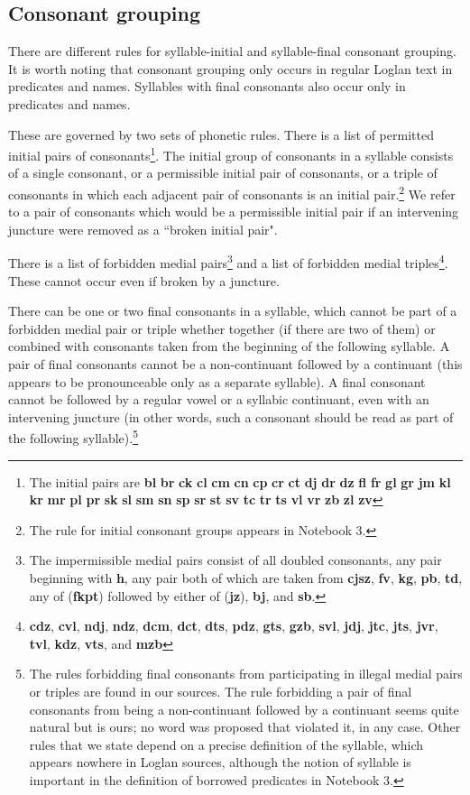 \documentclass[12pt]{book}
\begin{document}
\subsection{Consonant grouping}

There are different rules for syllable-initial and syllable-final consonant grouping.  It is worth noting that consonant grouping only occurs in regular Loglan text in predicates and names.   Syllables with final consonants also occur only in predicates and names.

These are governed by two sets of phonetic rules.  There is a list of permitted initial pairs of consonants\footnote{The initial pairs are {\bf bl}  {\bf br}  {\bf ck}  {\bf cl}  {\bf cm}  {\bf cn}   {\bf cp}  {\bf cr}   {\bf ct}   {\bf dj}   {\bf dr}   {\bf dz}  {\bf fl}  {\bf fr}   {\bf gl}   {\bf gr}   {\bf jm}   {\bf kl}  {\bf kr}   {\bf mr}   {\bf pl}  {\bf pr}   {\bf sk}  {\bf sl}   {\bf sm}  {\bf sn}  {\bf sp}   {\bf sr}  {\bf st}  {\bf sv} {\bf tc}  {\bf tr}  {\bf ts}  {\bf vl}  {\bf vr} {\bf  zb}  {\bf  zl}  {\bf zv}}.  The initial group of consonants in a syllable consists of a single consonant, or a permissible initial pair of consonants, or a triple of consonants in which each adjacent pair of consonants is an initial pair.\footnote{The rule for initial consonant groups appears in Notebook 3.}  We refer to a pair of consonants which would be a permissible initial pair if an intervening juncture were removed as a ``broken initial pair".

There is a list of forbidden medial pairs\footnote{The impermissible medial pairs consist of all doubled consonants, any pair beginning with {\bf h}, any pair both of which are taken from {\bf cjsz}, {\bf fv}, {\bf kg}, {\bf pb}, {\bf td}, any of ({\bf fkpt}) followed by either of ({\bf jz}), {\bf bj}, and {\bf sb}.}
and a list of forbidden medial triples\footnote{{\bf cdz}, {\bf cvl}, {\bf ndj}, {\bf ndz}, {\bf dcm}, {\bf dct}, {\bf dts}, {\bf pdz}, {\bf gts}, {\bf gzb}, {\bf svl}, {\bf jdj}, {\bf jtc}, {\bf jts}, {\bf jvr}, {\bf tvl}, {\bf kdz}, {\bf vts}, and {\bf mzb}}. 
 These cannot occur even if broken by a juncture.  

There can be one or two final consonants in
a syllable, which cannot be part of a forbidden medial pair or triple whether together (if there are two of them) or combined with consonants taken from the beginning of the following syllable.  A pair of final consonants cannot be a non-continuant followed by a continuant (this appears to be pronounceable only as a separate syllable).  A final consonant cannot be followed by a regular vowel or a syllabic continuant, even with an intervening juncture (in other words, such a consonant should be read as part of the following syllable).\footnote{The rules forbidding final consonants from participating in illegal medial pairs or triples are found in our sources.  The rule forbidding a pair of final consonants from being a non-continuant followed by a continuant seems quite natural but is ours;  no word was proposed that violated it, in any case.  Other rules that we state depend on a precise definition of the syllable, which appears nowhere in Loglan sources, although the notion of syllable is important in the definition of borrowed predicates in Notebook 3.}
\end{document}
